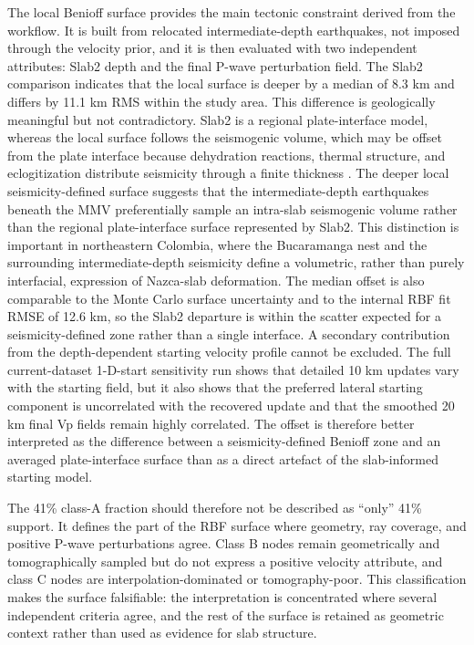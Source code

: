 \documentclass[review,authoryear]{elsarticle}
\begin{document}
The local Benioff surface provides the main tectonic constraint derived from the workflow. It is built from relocated intermediate-depth earthquakes, not imposed through the velocity prior, and it is then evaluated with two independent attributes: Slab2 depth and the final P-wave perturbation field. The Slab2 comparison indicates that the local surface is deeper by a median of 8.3 km and differs by 11.1 km RMS within the study area. This difference is geologically meaningful but not contradictory. Slab2 is a regional plate-interface model, whereas the local surface follows the seismogenic volume, which may be offset from the plate interface because dehydration reactions, thermal structure, and eclogitization distribute seismicity through a finite thickness \citep{Hacker2003,vanKeken2011}. The deeper local seismicity-defined surface suggests that the intermediate-depth earthquakes beneath the MMV preferentially sample an intra-slab seismogenic volume rather than the regional plate-interface surface represented by Slab2. This distinction is important in northeastern Colombia, where the Bucaramanga nest and the surrounding intermediate-depth seismicity define a volumetric, rather than purely interfacial, expression of Nazca-slab deformation. The median offset is also comparable to the Monte Carlo surface uncertainty and to the internal RBF fit RMSE of 12.6 km, so the Slab2 departure is within the scatter expected for a seismicity-defined zone rather than a single interface. A secondary contribution from the depth-dependent starting velocity profile cannot be excluded. The full current-dataset 1-D-start sensitivity run shows that detailed 10 km updates vary with the starting field, but it also shows that the preferred lateral starting component is uncorrelated with the recovered update and that the smoothed 20 km final Vp fields remain highly correlated. The offset is therefore better interpreted as the difference between a seismicity-defined Benioff zone and an averaged plate-interface surface than as a direct artefact of the slab-informed starting model.

The 41\% class-A fraction should therefore not be described as ``only'' 41\% support. It defines the part of the RBF surface where geometry, ray coverage, and positive P-wave perturbations agree. Class B nodes remain geometrically and tomographically sampled but do not express a positive velocity attribute, and class C nodes are interpolation-dominated or tomography-poor. This classification makes the surface falsifiable: the interpretation is concentrated where several independent criteria agree, and the rest of the surface is retained as geometric context rather than used as evidence for slab structure.
\end{document}

